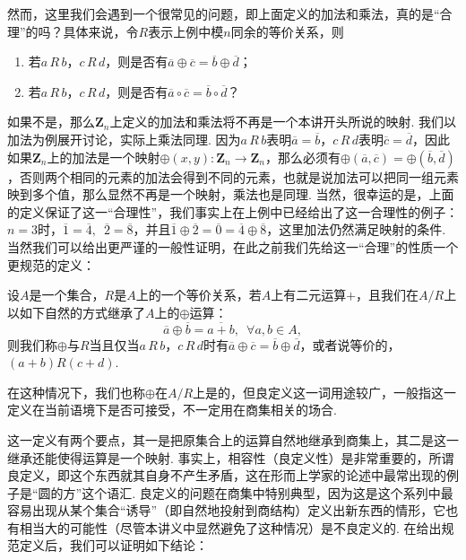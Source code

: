 然而，这里我们会遇到一个很常见的问题，即上面定义的加法和乘法，真的是``合理''的吗？具体来说，令$R$表示上例中模$n$同余的等价关系，则
\begin{enumerate}
    \item 若$a\,R\,b$，$c\,R\,d$，则是否有$\overline{a}\oplus\overline{c}=\overline{b}\oplus\overline{d}$；
    \item 若$a\,R\,b$，$c\,R\,d$，则是否有$\overline{a}\circ\overline{c}=\overline{b}\circ\overline{d}$？
\end{enumerate}
如果不是，那么$\mathbf{Z}_n$上定义的加法和乘法将不再是一个本讲开头所说的映射. 我们以加法为例展开讨论，实际上乘法同理. 因为$a\,R\,b$表明$\overline{a}=\overline{b}$，$c\,R\,d$表明$\overline{c}=\overline{d}$，因此如果$\mathbf{Z}_n$上的加法是一个映射$\oplus(x,y)\colon\mathbf{Z}_n\to \mathbf{Z}_n$，那么必须有$\oplus(\overline{a},\overline{c})=\oplus(\overline{b},\overline{d})$，否则两个相同的元素的加法会得到不同的元素，也就是说加法可以把同一组元素映到多个值，那么显然不再是一个映射，乘法也是同理. 当然，很幸运的是，上面的定义保证了这一``合理性''，我们事实上在上例中已经给出了这一合理性的例子：$n=3$时，$\overline{1}=\overline{4},\enspace\overline{2}=\overline{8}$，并且$\overline{1}\oplus\overline{2}=\overline{0}=\overline{4}\oplus\overline{8}$，这里加法仍然满足映射的条件. 当然我们可以给出更严谨的一般性证明，在此之前我们先给这一``合理''的性质一个更规范的定义：
\begin{definition}{}{}
    设$A$是一个集合，$R$是$A$上的一个等价关系，若$A$上有二元运算$+$，且我们在$A/R$上以如下自然的方式继承了$A$上的$\oplus$运算：
    \[\overline{a}\oplus\overline{b}=\overline{a+b},\enspace\forall a,b\in A,\]
    则我们称$\oplus$与$R$当且仅当$a\,R\,b$，$c\,R\,d$时有$\overline{a}\oplus\overline{c}=\overline{b}\oplus\overline{d}$，或者说等价的，$(a+b)R(c+d)$.
\end{definition}

在这种情况下，我们也称$\oplus$在$A/R$上是的，但良定义这一词用途较广，一般指这一定义在当前语境下是否可接受，不一定用在商集相关的场合.

这一定义有两个要点，其一是把原集合上的运算自然地继承到商集上，其二是这一继承还能使得运算是一个映射. 事实上，相容性（良定义性）是非常重要的，所谓良定义，即这个东西就其自身不产生矛盾，这在形而上学家的论述中最常出现的例子是``圆的方''这个语汇. 良定义的问题在商集中特别典型，因为这是这个系列中最容易出现从某个集合``诱导''（即自然地投射到商结构）定义出新东西的情形，它也有相当大的可能性（尽管本讲义中显然避免了这种情况）是不良定义的. 在给出规范定义后，我们可以证明如下结论：

